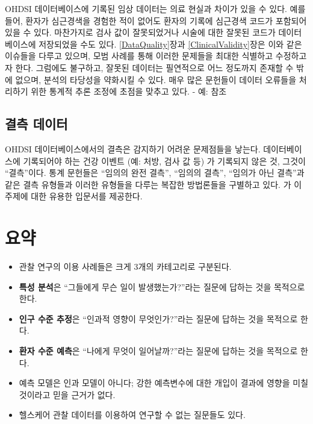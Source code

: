 \documentclass[11pt]{book}
\theoremstyle{definition}
\theoremstyle{definition}
\theoremstyle{definition}
\theoremstyle{remark}
\let\BeginKnitrBlock\begin \let\EndKnitrBlock\end
\begin{document}
OHDSI 데이터베이스에 기록된 임상 데이터는 의료 현실과 차이가 있을 수
있다. 예를 들어, 환자가 심근경색을 경험한 적이 없어도 환자의 기록에
심근경색 코드가 포함되어 있을 수 있다. 마찬가지로 검사 값이 잘못되었거나
시술에 대한 잘못된 코드가 데이터베이스에 저장되었을 수도 있다.
\ref{DataQuality}장과 \ref{ClinicalValidity}장은 이와 같은 이슈들을
다루고 있으며, 모범 사례를 통해 이러한 문제들을 최대한 식별하고
수정하고자 한다. 그럼에도 불구하고, 잘못된 데이터는 필연적으로 어느
정도까지 존재할 수 밖에 없으며, 분석의 타당성을 약화시킬 수 있다. 매우
많은 문헌들이 데이터 오류들을 처리하기 위한 통계적 추론 조정에 초점을
맞추고 있다. - 예: \citet{fuller2009measurement} 참조

\subsection{결측 데이터}\label{-}


OHDSI 데이터베이스에서의 결측은 감지하기 어려운 문제점들을 낳는다.
데이터베이스에 기록되어야 하는 건강 이벤트 (예: 처방, 검사 값 등) 가
기록되지 않은 것, 그것이 ``결측''이다. 통계 문헌들은 ``임의의 완전
결측'', ``임의의 결측'', ``임의가 아닌 결측''과 같은 결측 유형들과
이러한 유형들을 다루는 복잡한 방법론들을 구별하고 있다.
\citet{perkins2017principled} 가 이 주제에 대한 유용한 입문서를
제공한다.

\section{요약}\label{-5}

\BeginKnitrBlock{rmdsummary}
\begin{itemize}
\item
  관찰 연구의 이용 사례들은 크게 3개의 카테고리로 구분된다.
\item
  \textbf{특성 분석}은 ``그들에게 무슨 일이 발생했는가?''라는 질문에
  답하는 것을 목적으로 한다.
\item
  \textbf{인구 수준 추정}은 ``인과적 영향이 무엇인가?''라는 질문에
  답하는 것을 목적으로 한다.
\item
  \textbf{환자 수준 예측}은 ``나에게 무엇이 일어날까?''라는 질문에
  답하는 것을 목적으로 한다.
\item
  예측 모델은 인과 모델이 아니다; 강한 예측변수에 대한 개입이 결과에
  영향을 미칠 것이라고 믿을 근거가 없다.
\item
  헬스케어 관찰 데이터를 이용하여 연구할 수 없는 질문들도 있다.
\end{itemize}
\EndKnitrBlock{rmdsummary}
\end{document}
